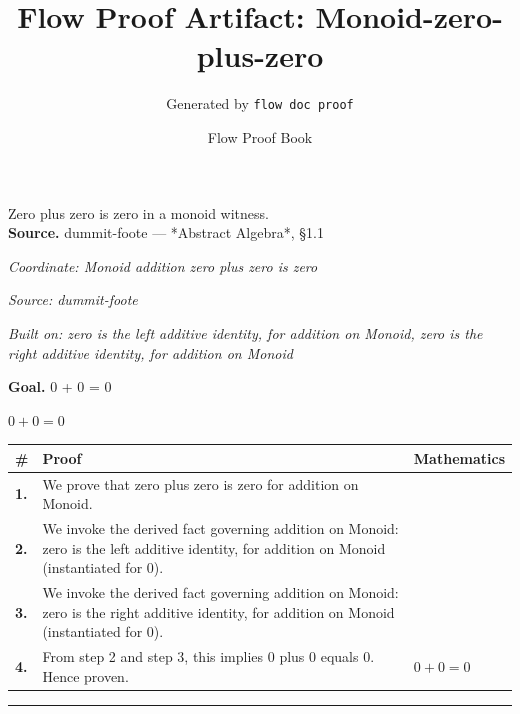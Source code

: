 \documentclass[11pt]{article}
\title{Flow Proof Artifact: Monoid-zero-plus-zero}
\author{Generated by \texttt{flow doc proof}}
\date{Flow Proof Book}
\theoremstyle{definition}
\begin{document}
\maketitle
Zero plus zero is zero in a monoid witness.\\[0.5em]
\textbf{Source.} dummit-foote — *Abstract Algebra*, §1.1\\[0.5em]
\bigskip
{}\par
\smallskip\noindent\textit{Coordinate: Monoid \cdot addition \cdot zero plus zero is zero}\par
\smallskip\noindent\textit{Source: dummit-foote}\par
\smallskip\noindent\textit{Built on: zero is the left additive identity, for addition on Monoid, zero is the right additive identity, for addition on Monoid}\par
\medskip
\noindent\textbf{Goal.} 0 + 0 = 0\par
\noindent$\displaystyle 0 + 0 = 0$\par
\medskip
\noindent
\begin{tabular}{@{} >{\raggedright\arraybackslash}p{} >{\raggedright\arraybackslash}p{} >{\raggedleft\arraybackslash}p{} @{}}
\textbf{\#} & \textbf{Proof} & \textbf{Mathematics} \\
\midrule
\textbf{1.} & We prove that zero plus zero is zero for addition on Monoid. & \\[0.45em]
\textbf{2.} & We invoke the derived fact governing addition on Monoid: zero is the left additive identity, for addition on Monoid (instantiated for 0). & \\[0.45em]
\textbf{3.} & We invoke the derived fact governing addition on Monoid: zero is the right additive identity, for addition on Monoid (instantiated for 0). & \\[0.45em]
\textbf{4.} & From step 2 and step 3, this implies 0 plus 0 equals 0. Hence proven. & $\displaystyle 0 + 0 = 0$ \\[0.45em]
\bottomrule
\end{tabular}
\label{thm:Monoid-addition-zero_plus_zero_is_zero}
\par\medskip\hrule
\end{document}
